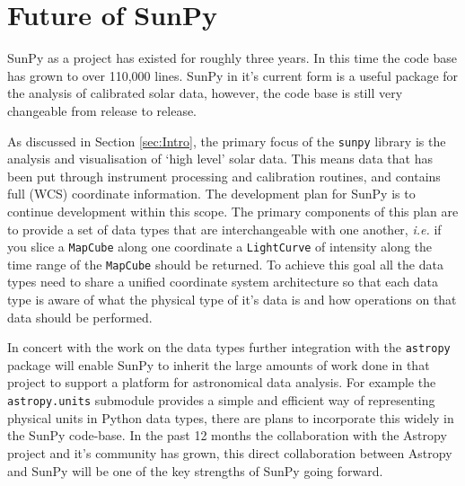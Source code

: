 \section{Future of SunPy}
SunPy as a project has existed for roughly three years. In this time the code 
base has grown to over 110,000 lines. SunPy in it's current form is a useful 
package for the analysis of calibrated solar data, however, the code base is 
still very changeable from release to release.

As discussed in Section \ref{sec:Intro}, the primary focus of the 
\texttt{sunpy} library is the analysis and visualisation of `high level' solar 
data. This means data that has been put through instrument processing and 
calibration routines, and contains full (WCS) coordinate information. The 
development plan for SunPy is to continue development within this scope. The 
primary components of this plan are to provide a set of data types that are 
interchangeable with one another, \textit{i.e.} if you slice a \texttt{MapCube} 
along one coordinate a \texttt{LightCurve} of intensity along the time range of 
the \texttt{MapCube} should be returned. To achieve this goal all the data 
types need to share a unified coordinate system architecture so that each data 
type is aware of what the physical type of it's data is and how operations on 
that data should be performed.

In concert with the work on the data types further integration with the 
\texttt{astropy} package will enable SunPy to inherit the large amounts of work 
done in that project to support a platform for astronomical data analysis. For 
example the \texttt{astropy.units} submodule provides a simple and efficient 
way of representing physical units in Python data types, there are plans to 
incorporate this widely in the SunPy code-base. In the past 12 months the 
collaboration with the Astropy project \cite{theastropycollaboration2013} and 
it's community has grown, this direct collaboration between Astropy and 
SunPy will be one of the key strengths of SunPy going forward.